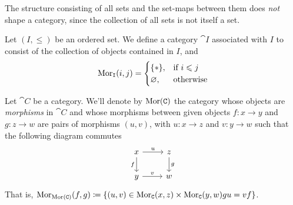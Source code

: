 \begin{remark}
    The structure consisting of all sets and the set-maps between them does
    \emph{not} shape a category, since the collection of all sets is not itself a
    set.
\end{remark}

\begin{example}
    \label{exp:order-category}
    Let \((I, \leq)\) be an ordered set. We define a category \(\cat I\)
    associated with \(I\) to consist of the collection of objects contained in
    \(I\), and
    \[
        \operatorname{Mor}_{\texttt I}(i, j) =
        \begin{cases}
            \{*\},     & \text{if } i \leqslant j \\
            \varnothing, & \text{otherwise}
        \end{cases}
    \]
\end{example}

\begin{definition}
    \label{def:morphism-category}
    Let \(\cat C\) be a category. We'll denote by \(\operatorname{Mor}(\texttt C)\) the category
    whose objects are \emph{morphisms} in \(\cat C\) and whose morphisms between
    given objects \(f: x \to y\) and \(g: z \to w\) are pairs of morphisms \((u,
    v)\), with \(u: x \to z\) and \(v: y \to w\) such that the following diagram
    commutes
    \[
        \begin{tikzcd}
            x \ar[d, swap, "f"] \ar[r, "u"] &z \ar[d, "g"] \\
            y \ar[r, "v"] &w
        \end{tikzcd}
    \]
    That is, \(\operatorname{Mor}_{\operatorname{Mor}(\texttt C)}(f, g) \coloneq \{(u, v) \in \operatorname{Mor}_{\texttt C}(x, z)
    \times \operatorname{Mor}_{\texttt C}(y, w) \relax g u = v f\}\).
\end{definition}

